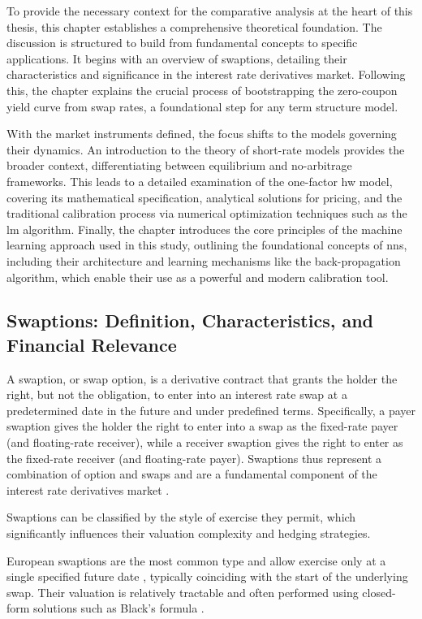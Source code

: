 To provide the necessary context for the comparative analysis at the heart of this thesis, this chapter establishes a comprehensive theoretical foundation. The discussion is structured to build from fundamental concepts to specific applications. It begins with an overview of swaptions, detailing their characteristics and significance in the interest rate derivatives market. Following this, the chapter explains the crucial process of bootstrapping the zero-coupon yield curve from swap rates, a foundational step for any term structure model.

With the market instruments defined, the focus shifts to the models governing their dynamics. An introduction to the theory of short-rate models provides the broader context, differentiating between equilibrium and no-arbitrage frameworks. This leads to a detailed examination of the one-factor \ac{hw} model, covering its mathematical specification, analytical solutions for pricing, and the traditional calibration process via numerical optimization techniques such as the \ac{lm} algorithm. Finally, the chapter introduces the core principles of the machine learning approach used in this study, outlining the foundational concepts of \ac{nn}s, including their architecture and learning mechanisms like the back-propagation algorithm, which enable their use as a powerful and modern calibration tool.

\subsection{Swaptions: Definition, Characteristics, and Financial Relevance} \label{swaptions}
A swaption, or swap option, is a derivative contract that grants the holder the right, but not the obligation, to enter into an interest rate swap at a predetermined date in the future and under predefined terms. Specifically, a payer swaption gives the holder the right to enter into a swap as the fixed-rate payer (and floating-rate receiver), while a receiver swaption gives the right to enter as the fixed-rate receiver (and floating-rate payer). Swaptions thus represent a combination of option and swaps and are a fundamental component of the interest rate derivatives market \parencite[pp.~19--20]{brigo2006interest}.

Swaptions can be classified by the style of exercise they permit, which significantly influences their valuation complexity and hedging strategies.

European swaptions are the most common type and allow exercise only at a single specified future date \parencite[p.~19]{brigo2006interest}, typically coinciding with the start of the underlying swap. Their valuation is relatively tractable and often performed using closed-form solutions such as Black's formula \parencite{black1976pricing}.


